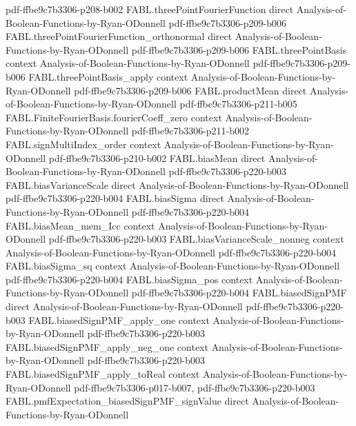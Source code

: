 \begin{theorem}
  {pdf-ffbe9c7b3306-p208-b002}
\proofstep
  {FABL.threePointFourierFunction}
  {direct}
  {Analysis-of-Boolean-Functions-by-Ryan-ODonnell}
  {pdf-ffbe9c7b3306-p209-b006}
\proofstep
  {FABL.threePointFourierFunction_orthonormal}
  {direct}
  {Analysis-of-Boolean-Functions-by-Ryan-ODonnell}
  {pdf-ffbe9c7b3306-p209-b006}
\proofstep
  {FABL.threePointBasis}
  {context}
  {Analysis-of-Boolean-Functions-by-Ryan-ODonnell}
  {pdf-ffbe9c7b3306-p209-b006}
\proofstep
  {FABL.threePointBasis_apply}
  {context}
  {Analysis-of-Boolean-Functions-by-Ryan-ODonnell}
  {pdf-ffbe9c7b3306-p209-b006}
\proofstep
  {FABL.productMean}
  {direct}
  {Analysis-of-Boolean-Functions-by-Ryan-ODonnell}
  {pdf-ffbe9c7b3306-p211-b005}
\proofstep
  {FABL.FiniteFourierBasis.fourierCoeff_zero}
  {context}
  {Analysis-of-Boolean-Functions-by-Ryan-ODonnell}
  {pdf-ffbe9c7b3306-p211-b002}
\proofstep
  {FABL.signMultiIndex_order}
  {context}
  {Analysis-of-Boolean-Functions-by-Ryan-ODonnell}
  {pdf-ffbe9c7b3306-p210-b002}
\proofstep
  {FABL.biasMean}
  {direct}
  {Analysis-of-Boolean-Functions-by-Ryan-ODonnell}
  {pdf-ffbe9c7b3306-p220-b003}
\proofstep
  {FABL.biasVarianceScale}
  {direct}
  {Analysis-of-Boolean-Functions-by-Ryan-ODonnell}
  {pdf-ffbe9c7b3306-p220-b004}
\proofstep
  {FABL.biasSigma}
  {direct}
  {Analysis-of-Boolean-Functions-by-Ryan-ODonnell}
  {pdf-ffbe9c7b3306-p220-b004}
\proofstep
  {FABL.biasMean_mem_Icc}
  {context}
  {Analysis-of-Boolean-Functions-by-Ryan-ODonnell}
  {pdf-ffbe9c7b3306-p220-b003}
\proofstep
  {FABL.biasVarianceScale_nonneg}
  {context}
  {Analysis-of-Boolean-Functions-by-Ryan-ODonnell}
  {pdf-ffbe9c7b3306-p220-b004}
\proofstep
  {FABL.biasSigma_sq}
  {context}
  {Analysis-of-Boolean-Functions-by-Ryan-ODonnell}
  {pdf-ffbe9c7b3306-p220-b004}
\proofstep
  {FABL.biasSigma_pos}
  {context}
  {Analysis-of-Boolean-Functions-by-Ryan-ODonnell}
  {pdf-ffbe9c7b3306-p220-b004}
\proofstep
  {FABL.biasedSignPMF}
  {direct}
  {Analysis-of-Boolean-Functions-by-Ryan-ODonnell}
  {pdf-ffbe9c7b3306-p220-b003}
\proofstep
  {FABL.biasedSignPMF_apply_one}
  {context}
  {Analysis-of-Boolean-Functions-by-Ryan-ODonnell}
  {pdf-ffbe9c7b3306-p220-b003}
\proofstep
  {FABL.biasedSignPMF_apply_neg_one}
  {context}
  {Analysis-of-Boolean-Functions-by-Ryan-ODonnell}
  {pdf-ffbe9c7b3306-p220-b003}
\proofstep
  {FABL.biasedSignPMF_apply_toReal}
  {context}
  {Analysis-of-Boolean-Functions-by-Ryan-ODonnell}
  {pdf-ffbe9c7b3306-p017-b007,
    pdf-ffbe9c7b3306-p220-b003}
\proofstep
  {FABL.pmfExpectation_biasedSignPMF_signValue}
  {direct}
  {Analysis-of-Boolean-Functions-by-Ryan-ODonnell}

\end{theorem}
